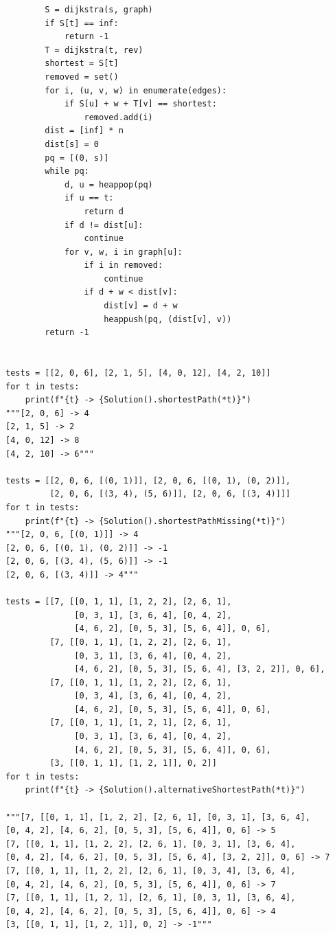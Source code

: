 \documentclass[12pt]{article}
\begin{document}
\begin{verbatim}
        S = dijkstra(s, graph)
        if S[t] == inf:
            return -1
        T = dijkstra(t, rev)
        shortest = S[t]
        removed = set()
        for i, (u, v, w) in enumerate(edges):
            if S[u] + w + T[v] == shortest:
                removed.add(i)
        dist = [inf] * n
        dist[s] = 0
        pq = [(0, s)]
        while pq:
            d, u = heappop(pq)
            if u == t:
                return d
            if d != dist[u]:
                continue
            for v, w, i in graph[u]:
                if i in removed:
                    continue
                if d + w < dist[v]:
                    dist[v] = d + w
                    heappush(pq, (dist[v], v))
        return -1


tests = [[2, 0, 6], [2, 1, 5], [4, 0, 12], [4, 2, 10]]
for t in tests:
    print(f"{t} -> {Solution().shortestPath(*t)}")
"""[2, 0, 6] -> 4
[2, 1, 5] -> 2
[4, 0, 12] -> 8
[4, 2, 10] -> 6"""

tests = [[2, 0, 6, [(0, 1)]], [2, 0, 6, [(0, 1), (0, 2)]],
         [2, 0, 6, [(3, 4), (5, 6)]], [2, 0, 6, [(3, 4)]]]
for t in tests:
    print(f"{t} -> {Solution().shortestPathMissing(*t)}")
"""[2, 0, 6, [(0, 1)]] -> 4
[2, 0, 6, [(0, 1), (0, 2)]] -> -1
[2, 0, 6, [(3, 4), (5, 6)]] -> -1
[2, 0, 6, [(3, 4)]] -> 4"""

tests = [[7, [[0, 1, 1], [1, 2, 2], [2, 6, 1],
              [0, 3, 1], [3, 6, 4], [0, 4, 2],
              [4, 6, 2], [0, 5, 3], [5, 6, 4]], 0, 6],
         [7, [[0, 1, 1], [1, 2, 2], [2, 6, 1],
              [0, 3, 1], [3, 6, 4], [0, 4, 2],
              [4, 6, 2], [0, 5, 3], [5, 6, 4], [3, 2, 2]], 0, 6],
         [7, [[0, 1, 1], [1, 2, 2], [2, 6, 1],
              [0, 3, 4], [3, 6, 4], [0, 4, 2],
              [4, 6, 2], [0, 5, 3], [5, 6, 4]], 0, 6],
         [7, [[0, 1, 1], [1, 2, 1], [2, 6, 1],
              [0, 3, 1], [3, 6, 4], [0, 4, 2],
              [4, 6, 2], [0, 5, 3], [5, 6, 4]], 0, 6],
         [3, [[0, 1, 1], [1, 2, 1]], 0, 2]]
for t in tests:
    print(f"{t} -> {Solution().alternativeShortestPath(*t)}")

"""[7, [[0, 1, 1], [1, 2, 2], [2, 6, 1], [0, 3, 1], [3, 6, 4],
[0, 4, 2], [4, 6, 2], [0, 5, 3], [5, 6, 4]], 0, 6] -> 5
[7, [[0, 1, 1], [1, 2, 2], [2, 6, 1], [0, 3, 1], [3, 6, 4],
[0, 4, 2], [4, 6, 2], [0, 5, 3], [5, 6, 4], [3, 2, 2]], 0, 6] -> 7
[7, [[0, 1, 1], [1, 2, 2], [2, 6, 1], [0, 3, 4], [3, 6, 4],
[0, 4, 2], [4, 6, 2], [0, 5, 3], [5, 6, 4]], 0, 6] -> 7
[7, [[0, 1, 1], [1, 2, 1], [2, 6, 1], [0, 3, 1], [3, 6, 4],
[0, 4, 2], [4, 6, 2], [0, 5, 3], [5, 6, 4]], 0, 6] -> 4
[3, [[0, 1, 1], [1, 2, 1]], 0, 2] -> -1"""
\end{verbatim}
\end{document}
